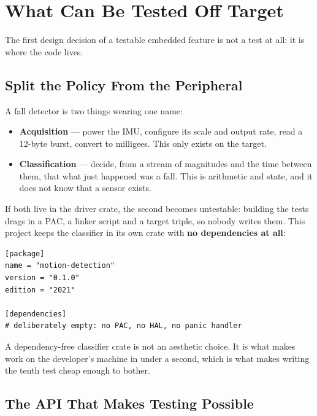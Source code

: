 \section{What Can Be Tested Off Target}
\label{sec:off-target-testing}

The first design decision of a testable embedded feature is not a test at all: it is where
the code lives.

\subsection{Split the Policy From the Peripheral}

A fall detector is two things wearing one name:

\begin{itemize}
    \item \textbf{Acquisition} — power the IMU, configure its scale and output rate, read a
          12-byte burst, convert to milligees. This only exists on the target.
    \item \textbf{Classification} — decide, from a stream of magnitudes and the time between
          them, that what just happened was a fall. This is arithmetic and state, and it does
          not know that a sensor exists.
\end{itemize}

If both live in the driver crate, the second becomes untestable: building the tests drags in
a PAC, a linker script and a target triple, so nobody writes them. This project keeps the
classifier in its own crate with \textbf{no dependencies at all}:

\begin{verbatim}
[package]
name = "motion-detection"
version = "0.1.0"
edition = "2021"

[dependencies]
# deliberately empty: no PAC, no HAL, no panic handler
\end{verbatim}

\begin{tipbox}
    A dependency-free classifier crate is not an aesthetic choice. It is what makes
     work on the developer's machine in under a second, which is what
    makes writing the tenth test cheap enough to bother.
\end{tipbox}

\subsection{The API That Makes Testing Possible}

